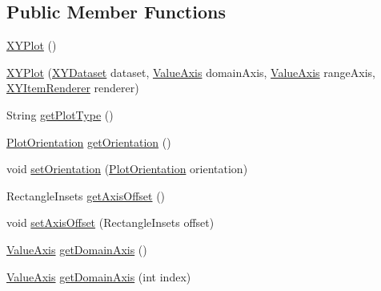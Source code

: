 \subsection*{Public Member Functions}
\begin{DoxyCompactItemize}
\item 
\mbox{\hyperlink{classorg_1_1jfree_1_1chart_1_1plot_1_1_x_y_plot_a0845016409bea095bd8e2f7ca81ea3ae}{X\+Y\+Plot}} ()
\item 
\mbox{\hyperlink{classorg_1_1jfree_1_1chart_1_1plot_1_1_x_y_plot_a7e075881c7eac23b2937511a24a727b0}{X\+Y\+Plot}} (\mbox{\hyperlink{interfaceorg_1_1jfree_1_1data_1_1xy_1_1_x_y_dataset}{X\+Y\+Dataset}} dataset, \mbox{\hyperlink{classorg_1_1jfree_1_1chart_1_1axis_1_1_value_axis}{Value\+Axis}} domain\+Axis, \mbox{\hyperlink{classorg_1_1jfree_1_1chart_1_1axis_1_1_value_axis}{Value\+Axis}} range\+Axis, \mbox{\hyperlink{interfaceorg_1_1jfree_1_1chart_1_1renderer_1_1xy_1_1_x_y_item_renderer}{X\+Y\+Item\+Renderer}} renderer)
\item 
String \mbox{\hyperlink{classorg_1_1jfree_1_1chart_1_1plot_1_1_x_y_plot_ab22dc2addcd858fc304816629a8cdcdb}{get\+Plot\+Type}} ()
\item 
\mbox{\hyperlink{classorg_1_1jfree_1_1chart_1_1plot_1_1_plot_orientation}{Plot\+Orientation}} \mbox{\hyperlink{classorg_1_1jfree_1_1chart_1_1plot_1_1_x_y_plot_a5b0c5d43d190ffdfc7cdee341c0e6990}{get\+Orientation}} ()
\item 
void \mbox{\hyperlink{classorg_1_1jfree_1_1chart_1_1plot_1_1_x_y_plot_ad73a9df6f61a586d34de8ac37303025b}{set\+Orientation}} (\mbox{\hyperlink{classorg_1_1jfree_1_1chart_1_1plot_1_1_plot_orientation}{Plot\+Orientation}} orientation)
\item 
Rectangle\+Insets \mbox{\hyperlink{classorg_1_1jfree_1_1chart_1_1plot_1_1_x_y_plot_a26062a5440ddb2cda7513504233dce62}{get\+Axis\+Offset}} ()
\item 
void \mbox{\hyperlink{classorg_1_1jfree_1_1chart_1_1plot_1_1_x_y_plot_a24db1e35222ca5d959dd0cb8246ed6b7}{set\+Axis\+Offset}} (Rectangle\+Insets offset)
\item 
\mbox{\hyperlink{classorg_1_1jfree_1_1chart_1_1axis_1_1_value_axis}{Value\+Axis}} \mbox{\hyperlink{classorg_1_1jfree_1_1chart_1_1plot_1_1_x_y_plot_a2c5e698142aa9597e1aa2d73bec69451}{get\+Domain\+Axis}} ()
\item 
\mbox{\hyperlink{classorg_1_1jfree_1_1chart_1_1axis_1_1_value_axis}{Value\+Axis}} \mbox{\hyperlink{classorg_1_1jfree_1_1chart_1_1plot_1_1_x_y_plot_a7a5100655e8e30cfc464b0b4f52db0e1}{get\+Domain\+Axis}} (int index)

\end{DoxyCompactItemize}
